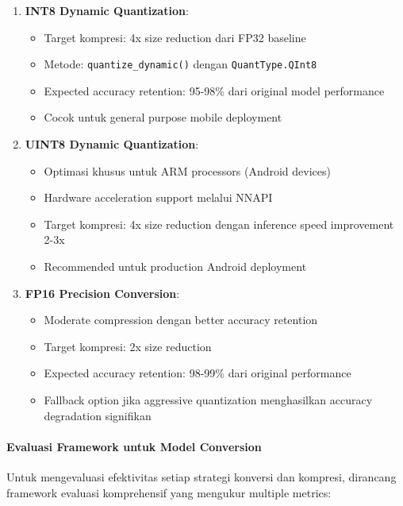 \begin{enumerate}
    \item \textbf{INT8 Dynamic Quantization}: 
    \begin{itemize}
        \item Target kompresi: 4x size reduction dari FP32 baseline
        \item Metode: \texttt{quantize\_dynamic()} dengan \texttt{QuantType.QInt8}
        \item Expected accuracy retention: 95-98\% dari original model performance
        \item Cocok untuk general purpose mobile deployment
    \end{itemize}
    
    \item \textbf{UINT8 Dynamic Quantization}: 
    \begin{itemize}
        \item Optimasi khusus untuk ARM processors (Android devices)
        \item Hardware acceleration support melalui NNAPI
        \item Target kompresi: 4x size reduction dengan inference speed improvement 2-3x
        \item Recommended untuk production Android deployment
    \end{itemize}
    
    \item \textbf{FP16 Precision Conversion}:
    \begin{itemize}
        \item Moderate compression dengan better accuracy retention
        \item Target kompresi: 2x size reduction
        \item Expected accuracy retention: 98-99\% dari original performance
        \item Fallback option jika aggressive quantization menghasilkan accuracy degradation signifikan
    \end{itemize}
\end{enumerate}

\paragraph{Evaluasi Framework untuk Model Conversion}
Untuk mengevaluasi efektivitas setiap strategi konversi dan kompresi, dirancang framework evaluasi komprehensif yang mengukur multiple metrics:

